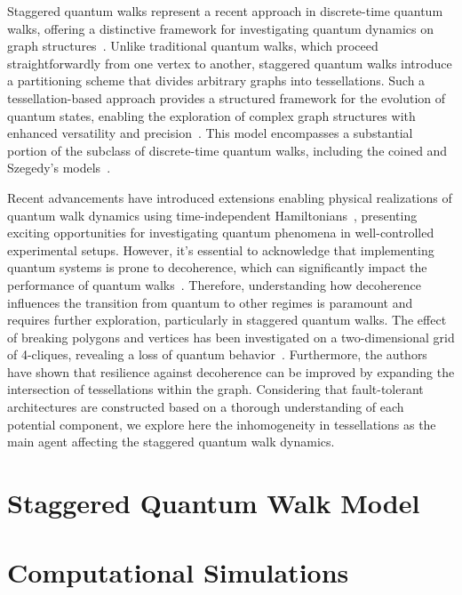 \documentclass[11pt]{article}
\theoremstyle{plain}
\begin{document}
Staggered quantum walks represent a recent approach in discrete-time quantum
walks, offering a distinctive framework for investigating quantum dynamics on
graph structures~\cite{PhysRevA.93.062335,Portugal2016}. Unlike traditional
quantum walks, which proceed straightforwardly from one vertex to another,
staggered quantum walks introduce a partitioning scheme that divides arbitrary
graphs into tessellations. Such a tessellation-based approach provides a
structured framework for the evolution of quantum states, enabling the
exploration of complex graph structures with enhanced versatility and
precision~\cite{PhysRevA.98.052310,PhysRevA.98.012123}.  This model encompasses
a substantial portion of the subclass of discrete-time quantum walks, including
the coined and Szegedy's
models~\cite{Portugal2016,Portugal2016_1,PhysRevA.95.012328}.

Recent advancements have introduced extensions enabling physical realizations
of quantum walk dynamics using time-independent
Hamiltonians~\cite{PhysRevA.95.012328,PhysRevB.95.144506}, presenting exciting
opportunities for investigating quantum phenomena in well-controlled
experimental setups. However, it's essential to acknowledge that implementing
quantum systems is prone to decoherence, which can significantly impact the
performance of quantum
walks~\cite{KENDON_2007,PhysRevA.103.042213,PhysRevLett.104.153602,PhysRevLett.106.180403}.
Therefore, understanding how decoherence influences the transition from quantum
to other regimes is paramount and requires further exploration, particularly in
staggered quantum walks. The effect of breaking polygons and vertices has been
investigated on a two-dimensional grid of 4-cliques, revealing a loss of
quantum behavior~\cite{PhysRevA.105.032452}. Furthermore, the authors have
shown that resilience against decoherence can be improved by expanding the
intersection of tessellations within the graph. Considering that fault-tolerant
architectures are constructed based on a thorough understanding of each
potential component, we explore here the inhomogeneity in tessellations as the
main agent affecting the staggered quantum walk dynamics. 


\section{Staggered Quantum Walk Model}


\section{Computational Simulations}
\end{document}
